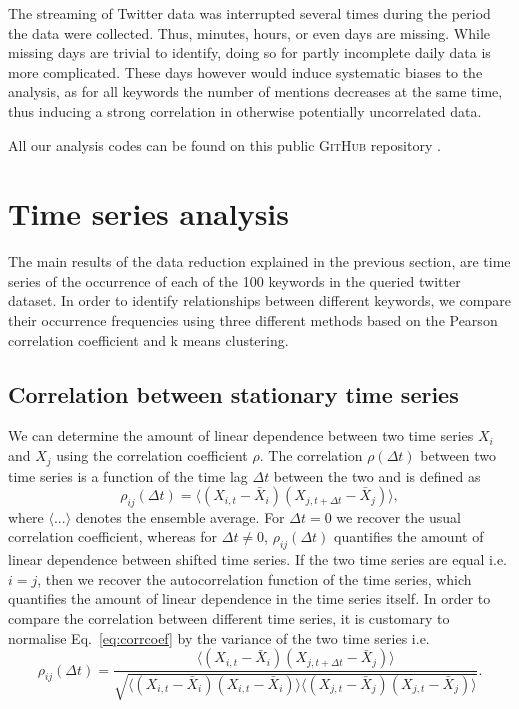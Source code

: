 \documentclass[12pt, a4paper]{article}
\begin{document}
The streaming of Twitter data was interrupted several times during the period the data were collected. Thus, minutes, hours, or even days are missing. While missing days are trivial to identify, doing so for partly incomplete daily data is more complicated. These days however would induce systematic biases to the analysis, as for all keywords the number of mentions decreases at the same time, thus inducing a strong correlation in otherwise potentially uncorrelated data.

All our analysis codes can be found on this public \textsc{GitHub} repository \cite{github}.

\section{Time series analysis}
The main results of the data reduction explained in the previous section, are time series of the occurrence of each of the 100 keywords in the queried twitter dataset. In order to identify relationships between different keywords, we compare their occurrence frequencies using three different methods based on the Pearson correlation coefficient and k means clustering. 

\subsection{Correlation between stationary time series}
We can determine the amount of linear dependence between two time series $X_{i}$ and $X_{j}$ using the correlation coefficient $\rho$. The correlation $\rho(\Delta t)$ between two time series is a function of the time lag $\Delta t$ between the two and is defined as \cite{dettling14}
\begin{equation}
\rho_{ij}(\Delta t) = \langle (X_{i, t}-\bar{X}_{i}) (X_{j, t+\Delta t}-\bar{X}_{j}) \rangle, \label{eq:corrcoef}
\end{equation} 
where $\langle ... \rangle$ denotes the ensemble average. For $\Delta t = 0$ we recover the usual correlation coefficient, whereas for $\Delta t \neq 0$, $\rho_{ij}(\Delta t)$ quantifies the amount of linear dependence between shifted time series. If the two time series are equal i.e. $i = j$, then we recover the autocorrelation function of the time series, which quantifies the amount of linear dependence in the time series itself. In order to compare the correlation between different time series, it is customary to normalise Eq.~\ref{eq:corrcoef} by the variance of the two time series i.e. \cite{dettling14}
\begin{equation}
\rho_{ij}(\Delta t) = \frac{\langle (X_{i, t}-\bar{X}_{i}) (X_{j, t+\Delta t}-\bar{X}_{j}) \rangle}{\sqrt{\langle (X_{i, t}-\bar{X}_{i}) (X_{i, t}-\bar{X}_{i}) \rangle \langle (X_{j, t}-\bar{X}_{j}) (X_{j, t}-\bar{X}_{j}) \rangle}}. \label{eq:corrcoef1}
\end{equation} 
\end{document}
